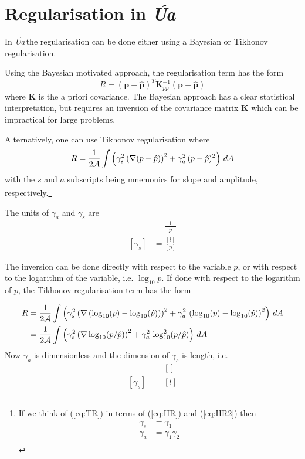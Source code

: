 \documentclass[10pt,a4paper]{book}
\newcommand{\Ua}{\textsl{\'Ua}\,}
\begin{document}
\section{Regularisation in \Ua}

In \Ua the regularisation can be done either using a Bayesian or
Tikhonov regularisation. 


Using the Bayesian motivated approach, the regularisation term has the form
\begin{equation}
R=(\bm{p}-\hat{\bm{p}})^T \bm{K}^{-1}_{pp} (\bm{p}-\hat{\bm{p}})
\label{eq:BR}
\end{equation}
where $\bm{K}$ is the a priori covariance. The Bayesian approach has a
clear statistical interpretation, but requires an inversion of the
covariance matrix $\bm{K}$ which can be impractical for large problems.

Alternatively, one can use Tikhonov regularisation where
\begin{equation}
R=  \frac{1}{2\cal{A}} \int \left ( \gamma_s^2   \left ( \nabla( p - \hat{p}) \right )^2 + \gamma_a^2 \, (p-\hat{p})^2 \right ) \, dA
\label{eq:TR}
\end{equation}
with the $s$ and $a$ subscripts being mnemonics for slope and
amplitude, respectively.\footnote{If we think of (\ref{eq:TR}) in terms of (\ref{eq:HR}) and (\ref{eq:HR2}) then
\begin{align*}
\gamma_s & =\gamma_1 \\
\gamma_a &=\gamma_1  \gamma_2\\
\end{align*}}

The units of $\gamma_a$ and $\gamma_s$ are 
\begin{align*}
[\gamma_a] &= \frac{1}{[p]} \\
[\gamma_s] &= \frac{[l]}{[p]} 
\end{align*}

The inversion can be done directly with respect to the variable $p$,
or with respect to the logarithm of the variable, i.e.  $\log_{10}
p$. If done with respect to the logarithm of $p$, the Tikhonov
regularisation term has the form

\begin{align}
R & =  \frac{1}{2\cal{A}} \int \left ( \gamma_s^2   \left ( \nabla \left ( \log_{10}(p) - \log_{10}(\hat{p}) \right ) \right )^2 + \gamma_a^2 \, \left (\log_{10}(p)-\log_{10}(\hat{p}) \right )^2 \right ) \, dA \nonumber \\
  & =  \frac{1}{2\cal{A}} \int \left ( \gamma_s^2  \left ( \nabla   \log_{10}(p/\hat{p}) \right )^2   + \gamma_a^2 \,  \log_{10}^2(p/\hat{p})  \right ) \, dA 
\label{eq:TRlog1}
\end{align}
Now $\gamma_a$ is dimensionless and the dimension of $\gamma_s$ is length, i.e. 
\begin{align*}
[\gamma_a] &= [] \\
[\gamma_s] &= [l]
\end{align*}
\end{document}
